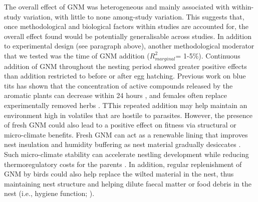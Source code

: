 \documentclass[
  number,
  review,
  onecolumn]{elsarticle}
\begin{document}
The overall effect of GNM was heterogeneous and mainly associated with
within-study variation, with little to none among-study variation. This
suggests that, once methodological and biological factors within studies
are accounted for, the overall effect found would be potentially
generalisable across studies. In addition to experimental design (see
paragraph above), another methodological moderator that we tested was
the time of GNM addition (\(R^2_{ma rginal}\)= 1-5\%). Continuous
addition of GNM throughout the nesting period showed greater positive
effects than addition restricted to before or after egg hatching.
Previous work on blue tits has shown that the concentration of active
compounds released by the aromatic plants can decrease within 24 hours
\citep{petit2002}, and females often replace experimentally removed
herbs \citep{mennerat2008, banbura1995}. TThis repeated addition may
help maintain an environment high in volatiles that are hostile to
parasites. However, the presence of fresh GNM could also lead to a
positive effect on fitness via structural or micro-climate benefits.
Fresh GNM can act as a renewable lining that improves nest insulation
and humidity buffering as nest material gradually desiccates
\citep{mertens1977, taverner1933}. Such micro-climate stability can
accelerate nestling development while reducing thermoregulatory costs
for the parents \citep{mainwaring2013}. In addition, regular
replenishment of GNM by birds could also help replace the wilted
material in the nest, thus maintaining nest structure and helping dilute
faecal matter or food debris in the nest (i.e., hygiene function;
\citep{peralta-sanchez2010}).
\end{document}
